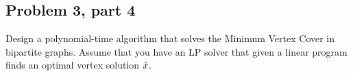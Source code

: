 \newpage
\subsection{Problem 3, part 4}
Design a polynomial-time algorithm that solves the Minimum Vertex Cover in bipartite graphs. Assume that you have an LP solver that given a linear program finds an optimal vertex solution $\hat{x}$.

